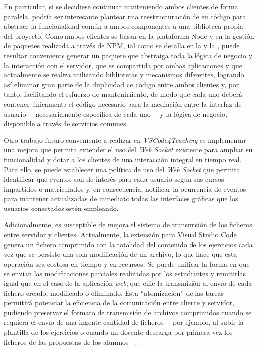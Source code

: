 En particular, si se decidiese continuar manteniendo ambos clientes de forma paralela, podría ser interesante plantear una reestructuración de su código para abstraer la funcionalidad común a ambos componentes a una biblioteca propia del proyecto. Como ambos clientes se basan en la plataforma Node y en la gestión de paquetes realizada a través de NPM, tal como se detalla en la  y la , puede resultar conveniente generar un paquete que abstraiga toda la lógica de negocio y la interacción con el servidor, que es compartida por ambas aplicaciones y que actualmente se realiza utilizando bibliotecas y mecanismos diferentes, logrando así eliminar gran parte de la duplicidad de código entre ambos clientes y, por tanto, facilitando el esfuerzo de mantenimiento, de modo que cada uno deberá contener únicamente el código necesario para la mediación entre la interfaz de usuario ---necesariamente específica de cada uno--- y la lógica de negocio, disponible a través de servicios comunes.

Otro trabajo futuro conveniente a realizar en \textit{VSCode4Teaching} es implementar una mejora que permita extender el uso del \textit{Web Socket} existente para ampliar su funcionalidad y dotar a los clientes de una interacción integral en tiempo real. Para ello, se puede establecer una política de uso del \textit{Web Socket} que permita identificar qué eventos son de interés para cada usuario según sus cursos impartidos o matriculados y, en consecuencia, notificar la ocurrencia de eventos para mantener actualizadas de inmediato todas las interfaces gráficas que los usuarios conectados estén empleando.

Adicionalmente, es susceptible de mejora el sistema de transmisión de los ficheros entre servidor y clientes. Actualmente, la extensión para Visual Studio Code genera un fichero comprimido con la totalidad del contenido de los ejercicios cada vez que se persiste una sola modificación de un archivo, lo que hace que esta operación sea costosa en tiempo y en recursos. Se puede unificar la forma en que se envían las modificaciones parciales realizadas por los estudiantes y remitirlas igual que en el caso de la aplicación \textit{web}, que ciñe la transmisión al envío de cada fichero creado, modificado o eliminado. Esta ``atomización'' de las tareas permitirá potenciar la eficiencia de la comunicación entre cliente y servidor, pudiendo preservar el formato de transmisión de archivos comprimidos cuando se requiera el envío de una ingente cantidad de ficheros ---por ejemplo, al subir la plantilla de los ejercicios o cuando un docente descarga por primera vez los ficheros de las propuestas de los alumnos---.



